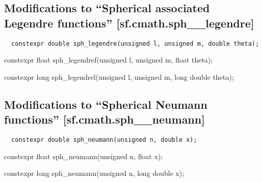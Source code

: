 \documentclass[prd,twocolumn,amsmath,amssymb,nofootinbib,eqsecnum]{revtex4-1}
\newcommand{\code}[1]{{\tt #1}}
\newcommand{\highlight}[1]{{\color{red} #1}}
\begin{document}
\subsection{Modifications to  ``Spherical associated Legendre functions''  [sf.cmath.sph\_\_legendre]}

\code{
	\highlight{constexpr} double sph\_legendre(unsigned l, unsigned m, double theta);
	
	\highlight{constexpr} float sph\_legendref(unsigned l, unsigned m, float theta);
	
	\highlight{constexpr} long sph\_legendrel(unsigned l, unsigned m, long double theta);

}

\subsection{Modifications to  ``Spherical Neumann functions''  [sf.cmath.sph\_\_neumann]}

\code{
	\highlight{constexpr} double sph\_neumann(unsigned n, double x);
	
	\highlight{constexpr} float sph\_neumann(unsigned n, float x);
	
	\highlight{constexpr} long sph\_neumann(unsigned n, long double x);

}
\end{document}

